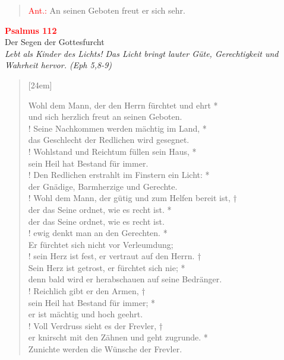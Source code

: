 \vspace*{1.6cm}

\begin{verse}
 \textcolor{red}{Ant.:} An seinen Geboten freut er sich sehr.
\end{verse}

\vspace*{0.5cm}

\begin{center}
 \textcolor{red}{\large \bf Psalmus 112}\\
Der Segen der Gottesfurcht\\
\textit{\small Lebt als Kinder des Lichts! Das Licht bringt lauter Güte, Gerechtigkeit und Wahrheit hervor. (Eph 5,8-9)}
\end{center}
\begin{verse}[24em]

Wohl dem Mann, der den Herrn fürchtet und ehrt *\\
und sich herzlich freut an seinen Geboten.\\!
\vin  Seine Nachkommen werden mächtig im Land, *\\
\vin  das Geschlecht der Redlichen wird gesegnet.\\!
Wohlstand und Reichtum füllen sein Haus, *\\
sein Heil hat Bestand für immer.\\!
\vin  Den Redlichen erstrahlt im Finstern ein Licht: *\\
\vin  der Gnädige, Barmherzige und Gerechte.\\!
Wohl dem Mann, der gütig und zum Helfen bereit ist, †\\
der das Seine ordnet, wie es recht ist. *\\
der das Seine ordnet, wie es recht ist.\\!
\vin  ewig denkt man an den Gerechten. *\\
\vin  Er fürchtet sich nicht vor Verleumdung;\\!
sein Herz ist fest, er vertraut auf den Herrn. †\nopagebreak\\
Sein Herz ist getrost, er fürchtet sich nie;  *\nopagebreak\\ 
 denn bald wird er herabschauen auf seine Bedränger.\\!
\vin Reichlich gibt er den Armen, †\\
\vin  sein Heil hat Bestand für immer;  *\\
\vin  er ist mächtig und hoch geehrt.\\!
Voll Verdruss sieht es der Frevler, †\\
er knirscht mit den Zähnen und geht zugrunde. *\\
Zunichte werden die Wünsche der Frevler. \\
\end{verse}
\vspace{1cm}

